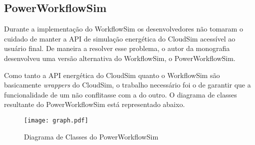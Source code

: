 \subsection{PowerWorkflowSim}
Durante a implementação do WorkflowSim os desenvolvedores não tomaram o cuidado
de manter a API de simulação energética do CloudSim acessível ao usuário final.
De maneira a resolver esse problema, o autor da monografia desenvolveu uma versão
alternativa do WorkflowSim, o PowerWorkflowSim.

Como tanto a API energética do CloudSim quanto o WorkflowSim são basicamente 
\emph{wrappers} do CloudSim, o trabalho necessário foi o de garantir que 
a funcionalidade de um não conflitasse com a do outro. O diagrama de classes
resultante do PowerWorkflowSim está representado abaixo.

\begin{figure}
\centering
\texttt{[image: graph.pdf]}
\caption{Diagrama de Classes do PowerWorkflowSim}
\label{fig:classes_powerworkflowsim}
\end{figure}


